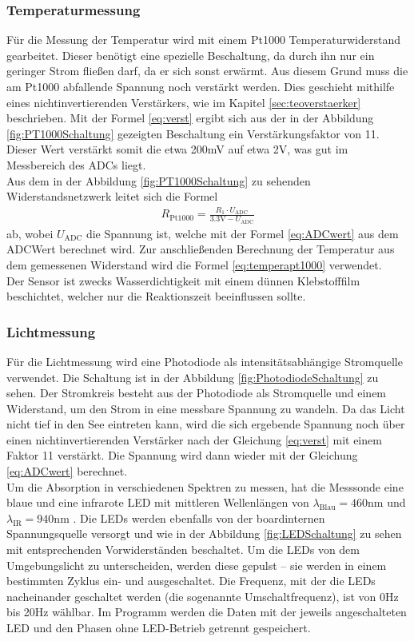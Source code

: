 \documentclass[12pt,a4paper,titlepage,headinclude,bibtotoc]{scrartcl}
\numberwithin{equation}{subsection}
\begin{document}
\subsubsection{Temperaturmessung}
Für die Messung der Temperatur wird mit einem Pt1000 Temperaturwiderstand gearbeitet.
Dieser benötigt eine spezielle Beschaltung, da durch ihn nur ein geringer Strom fließen darf, da er sich sonst erwärmt.
Aus diesem Grund muss die am Pt1000 abfallende Spannung noch verstärkt werden.
Dies geschieht mithilfe eines nichtinvertierenden Verstärkers, wie im Kapitel \ref{sec:teoverstaerker} beschrieben.
Mit der Formel \eqref{eq:verst} ergibt sich aus der in der Abbildung \ref{fig:PT1000Schaltung} gezeigten Beschaltung ein Verstärkungsfaktor von 11.
Dieser Wert verstärkt somit die etwa 200\si{\milli\volt} auf etwa 2\si{\volt}, was gut im Messbereich des ADCs liegt.\\
Aus dem in der Abbildung \ref{fig:PT1000Schaltung} zu sehenden Widerstandsnetzwerk leitet sich die Formel
\begin{align}
	R_\text{Pt1000}=\frac{R_1\cdot U_\text{ADC}}{3.3\si{\volt}-U_\text{ADC}}
\end{align}
ab, wobei $U_\text{ADC}$ die Spannung ist, welche mit der Formel \eqref{eq:ADCwert} aus dem ADCWert berechnet wird.
Zur anschließenden Berechnung der Temperatur aus dem gemessenen Widerstand wird die Formel \eqref{eq:temperapt1000} verwendet.\\
Der Sensor ist zwecks Wasserdichtigkeit mit einem dünnen Klebstofffilm  beschichtet, welcher nur die Reaktionszeit beeinflussen sollte.

\subsubsection{Lichtmessung}
Für die Lichtmessung wird eine Photodiode als intensitätsabhängige Stromquelle verwendet.
Die Schaltung ist in der Abbildung \ref{fig:PhotodiodeSchaltung} zu sehen.
Der Stromkreis besteht aus der Photodiode als Stromquelle und einem Widerstand, um den Strom in eine messbare Spannung zu wandeln.
Da das Licht nicht tief in den See eintreten kann, wird die sich ergebende Spannung noch über einen nichtinvertierenden Verstärker nach der Gleichung \ref{eq:verst} mit einem Faktor 11 verstärkt.
Die Spannung wird dann wieder mit der Gleichung \eqref{eq:ADCwert} berechnet.\\
Um die Absorption in verschiedenen Spektren zu messen, hat die Messsonde eine blaue und eine infrarote LED mit mittleren Wellenlängen von $\lambda_\text{Blau}=460\si{\nano\meter}$ \cite[2]{BLAUDatenblatt} und $\lambda_\text{IR}=940\si{\nano\meter}$ \cite[4]{IRDatenblatt}.
Die LEDs werden ebenfalls von der boardinternen Spannungsquelle versorgt und wie in der Abbildung \ref{fig:LEDSchaltung} zu sehen mit entsprechenden Vorwiderständen beschaltet.
Um die LEDs von dem Umgebungslicht zu unterscheiden, werden diese gepulst -- sie werden in einem bestimmten Zyklus ein- und ausgeschaltet.
Die Frequenz, mit der die LEDs nacheinander geschaltet werden (die sogenannte Umschaltfrequenz), ist von 0\si{\hertz} bis 20\si{\hertz} wählbar.
Im Programm werden die Daten mit der jeweils angeschalteten LED und den Phasen ohne LED-Betrieb getrennt gespeichert.
\end{document}
